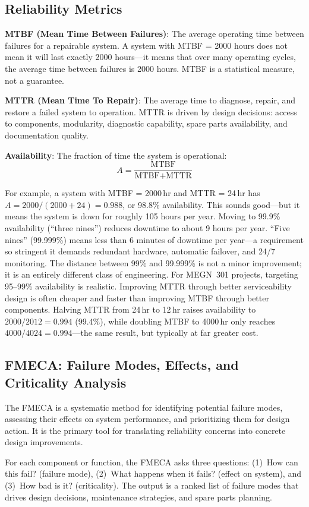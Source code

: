 \documentclass[11pt,letterpaper,twoside,openany]{book}
\begin{document}
\subsection{Reliability Metrics}
\textbf{MTBF (Mean Time Between Failures)}: The average operating time between failures for a repairable system. A system with MTBF = 2000 hours does not mean it will last exactly 2000 hours---it means that over many operating cycles, the average time between failures is 2000 hours. MTBF is a statistical measure, not a guarantee.

\textbf{MTTR (Mean Time To Repair)}: The average time to diagnose, repair, and restore a failed system to operation. MTTR is driven by design decisions: access to components, modularity, diagnostic capability, spare parts availability, and documentation quality.

\textbf{Availability}: The fraction of time the system is operational:
\[
A = \frac{\text{MTBF}}{\text{MTBF} + \text{MTTR}}
\]

For example, a system with MTBF = 2000\,hr and MTTR = 24\,hr has $A = 2000/(2000+24) = 0.988$, or 98.8\% availability. This sounds good---but it means the system is down for roughly 105 hours per year. Moving to 99.9\% availability (``three nines'') reduces downtime to about 9 hours per year. ``Five nines'' (99.999\%) means less than 6 minutes of downtime per year---a requirement so stringent it demands redundant hardware, automatic failover, and 24/7 monitoring. The distance between 99\% and 99.999\% is not a minor improvement; it is an entirely different class of engineering. For MEGN~301 projects, targeting 95--99\% availability is realistic. Improving MTTR through better serviceability design is often cheaper and faster than improving MTBF through better components. Halving MTTR from 24\,hr to 12\,hr raises availability to $2000/2012 = 0.994$ (99.4\%), while doubling MTBF to 4000\,hr only reaches $4000/4024 = 0.994$---the same result, but typically at far greater cost.

\subsection{FMECA: Failure Modes, Effects, and Criticality Analysis}
The FMECA is a systematic method for identifying potential failure modes, assessing their effects on system performance, and prioritizing them for design action. It is the primary tool for translating reliability concerns into concrete design improvements.

For each component or function, the FMECA asks three questions: (1)~How can this fail? (failure mode), (2)~What happens when it fails? (effect on system), and (3)~How bad is it? (criticality). The output is a ranked list of failure modes that drives design decisions, maintenance strategies, and spare parts planning.
\end{document}
